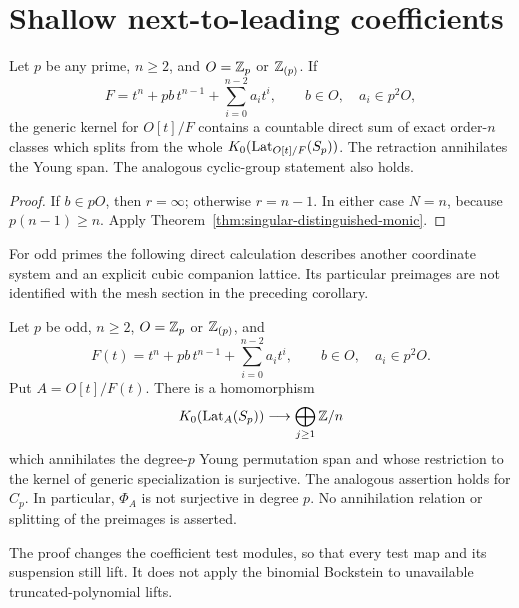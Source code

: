 \section{Shallow next-to-leading coefficients}
\label{sec:shallow-top-coefficient}

\begin{corollary}\label{cor:shallow-top-split}
Let \(p\) be any prime, \(n\ge2\), and \(O=\mathbb Z_p\) or
\(\mathbb Z_{(p)}\).  If
\[
 F=t^n+pb\,t^{n-1}+\sum_{i=0}^{n-2}a_it^i,
 \qquad b\in O,\quad a_i\in p^2O,
\]
the generic kernel for \(O[t]/F\) contains a countable direct sum
of exact order-\(n\) classes which splits from the whole
\(K_0(\operatorname{Lat}_{O[t]/F}(S_p))\).  The retraction annihilates the
Young span.  The analogous cyclic-group statement also holds.
\end{corollary}
\begin{proof}
If \(b\in pO\), then \(r=\infty\); otherwise \(r=n-1\).
In either case \(N=n\), because \(p(n-1)\ge n\).
Apply Theorem~\ref{thm:singular-distinguished-monic}.
\end{proof}

For odd primes the following direct calculation describes another
coordinate system and an explicit cubic companion lattice.
Its particular preimages are not identified with the mesh section
in the preceding corollary.

\begin{theorem}\label{thm:shallow-top-coefficient}
Let $p$ be odd, $n\ge2$, $O=\mathbb Z_p$ or $\mathbb Z_{(p)}$, and
\[
 F(t)=t^n+pb\,t^{n-1}+\sum_{i=0}^{n-2}a_it^i,
 \qquad b\in O,\quad a_i\in p^2O.
\]
Put $A=O[t]/F(t)$.  There is a homomorphism
\[
 K_0(\operatorname{Lat}_A(S_p))\longrightarrow\bigoplus_{j\ge1}\mathbb Z/n
\]
which annihilates the degree-$p$ Young permutation span and whose
restriction to the kernel of generic specialization is surjective.
The analogous assertion holds for $C_p$.
In particular, $\Phi_A$ is not surjective in degree $p$.
No annihilation relation or splitting of the preimages is asserted.
\end{theorem}

The proof changes the coefficient test modules, so that every test
map and its suspension still lift.  It does not apply the binomial
Bockstein to unavailable truncated-polynomial lifts.

